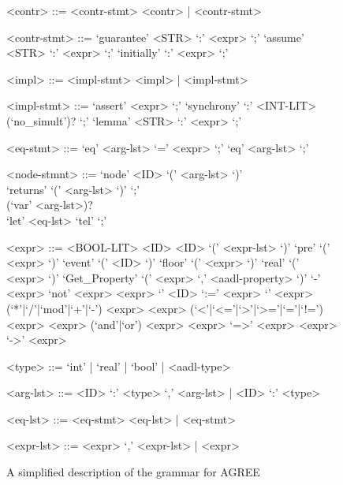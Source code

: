 \begin{figure}
\begin{grammar}
<contr> ::= <contr-stmt> <contr> | <contr-stmt>

<contr-stmt> ::= `guarantee' <STR> `:' <expr> `;'
\alt `assume' <STR> `:' <expr> `;'
\alt `initially' `:' <expr> `;'

<impl> ::= <impl-stmt> <impl> | <impl-stmt>

<impl-stmt> ::= `assert' <expr> `;'
\alt `synchrony' `:' <INT-LIT> (`no_simult')? `;'
\alt `lemma' <STR> `:' <expr> `;'

<eq-stmt> ::= `eq' <arg-lst> `=' <expr> `;'
\alt `eq' <arg-lst> `;'

<node-stmnt> ::= `node' <ID> `(' <arg-lst> `)' \\
`returns' `(' <arg-lst> `)' `;' \\
(`var' <arg-lst>)? \\
`let' <eq-lst> `tel' `;'

<expr> ::= <BOOL-LIT>
\alt <ID>
\alt <ID> `(' <expr-lst> `)'
\alt `pre' `(' <expr> `)'
\alt `event' `(' <ID> `)'
\alt `floor' `(' <expr> `)'
\alt `real' `(' <expr> `)'
\alt `Get_Property' `(' <expr> `,' <aadl-property> `)'
\alt `-' <expr>
\alt `not' <expr>
\alt <expr> `{' <ID> `:=' <expr> `}'
\alt <expr> (`*'|`/'|`mod'|`+'|`-') <expr>
\alt <expr> (`<'|`<='|`>'|`>='|`='|`!=') <expr>
\alt <expr> (`and'|`or') <expr>
\alt <expr> `=>' <expr>
\alt <expr> `->' <expr>

<type> ::= `int' | `real' | `bool' | <aadl-type>

<arg-lst> ::= <ID> `:' <type> `,' <arg-lst> | <ID> `:' <type>

<eq-lst> ::= <eq-stmt> <eq-lst> | <eq-stmt>

<expr-lst> ::= <expr> `,' <expr-lst> | <expr>

\end{grammar}
\caption{A simplified description of the grammar for AGREE}
\label{fig:grammar}
\end{figure}